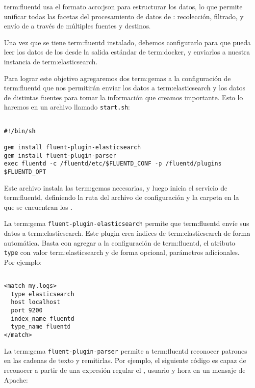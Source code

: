 \gls{term:fluentd} usa el formato \gls{acro:json} para estructurar los datos,
lo que permite unificar todas las facetas del procesamiento de datos de :
recolección, filtrado,  y envío de  a través de múltiples
fuentes y destinos.

Una vez que se tiene \gls{term:fluentd} instalado, debemos configurarlo para
que pueda leer los datos de los  desde la salida estándar de
\gls{term:docker}, y enviarlos a nuestra instancia de \gls{term:elasticsearch}.

Para lograr este objetivo agregaremos dos \glspl{term:gema} a la configuración de
\gls{term:fluentd} que nos permitirán enviar los datos a
\gls{term:elasticsearch} y  los datos de distintas fuentes para tomar la
información que creamos importante. Esto lo haremos en un archivo llamado
\texttt{start.sh}:

\begin{lstlisting}

#!/bin/sh

gem install fluent-plugin-elasticsearch
gem install fluent-plugin-parser
exec fluentd -c /fluentd/etc/$FLUENTD_CONF -p /fluentd/plugins $FLUENTD_OPT

\end{lstlisting}

Este archivo instala las \glspl{term:gema} necesarias, y luego inicia el
servicio de \gls{term:fluentd}, definiendo la ruta del archivo de configuración
y la carpeta en la que se encuentran los .

La \gls{term:gema} \texttt{fluent-plugin-elasticsearch} permite que \gls{term:fluentd}
envíe sus datos a \gls{term:elasticsearch}. Este plugin crea índices de
\gls{term:elasticsearch} de forma automática. Basta con agregar a la
configuración de \gls{term:fluentd}, el atributo \lstinline{type} con valor
\gls{term:elasticsearch} y de forma opcional, parámetros adicionales. Por
ejemplo:

\begin{lstlisting}

<match my.logs>
  type elasticsearch
  host localhost
  port 9200
  index_name fluentd
  type_name fluentd
</match>

\end{lstlisting}

La \gls{term:gema} \texttt{fluent-plugin-parser} permite a \gls{term:fluentd}
reconocer patrones en las cadenas de texto y remitirlas. Por ejemplo, el
siguiente código es capaz de reconocer a partir de una expresión regular el
, usuario y hora en un mensaje de Apache:

